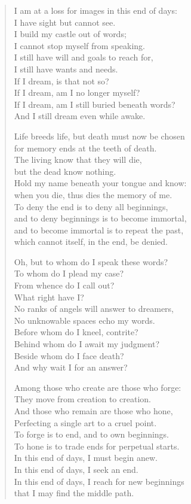 \begin{verse}
I am at a loss for images in this end of days:\\
I have sight but cannot see.\\
I build my castle out of words;\\
I cannot stop myself from speaking.\\
I still have will and goals to reach for,\\
I still have wants and needs.\\
If I dream, is that not so?\\
If I dream, am I no longer myself?\\
If I dream, am I still buried beneath words?\\
And I still dream even while awake.

Life breeds life, but death must now be chosen\\
for memory ends at the teeth of death.\\
The living know that they will die,\\
but the dead know nothing.\\
Hold my name beneath your tongue and know:\\
when you die, thus dies the memory of me.\\
To deny the end is to deny all beginnings,\\
and to deny beginnings is to become immortal,\\
and to become immortal is to repeat the past,\\
which cannot itself, in the end, be denied.

Oh, but to whom do I speak these words?\\
To whom do I plead my case?\\
From whence do I call out?\\
What right have I?\\
No ranks of angels will answer to dreamers,\\
No unknowable spaces echo my words.\\
Before whom do I kneel, contrite?\\
Behind whom do I await my judgment?\\
Beside whom do I face death?\\
And why wait I for an answer?

Among those who create are those who forge:\\
They move from creation to creation.\\
And those who remain are those who hone,\\
Perfecting a single art to a cruel point.\\
To forge is to end, and to own beginnings.\\
To hone is to trade ends for perpetual starts.\\
In this end of days, I must begin anew.\\
In this end of days, I seek an end.\\
In this end of days, I reach for new beginnings\\
that I may find the middle path.


\end{verse}
